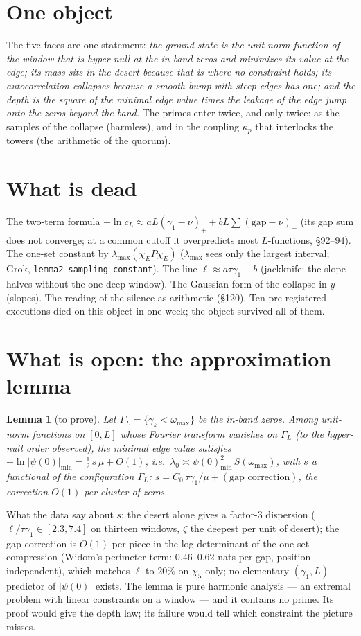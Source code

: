 \documentclass[11pt]{article}
\newtheorem{lemma}{Lemma}\newtheorem{conjecture}{Conjecture}
\begin{document}
\section{One object}
The five faces are one statement: \emph{the ground state is the unit-norm function of the window that is hyper-null at the in-band zeros and minimizes its value at the edge; its mass sits in the desert because that is where no constraint holds; its autocorrelation collapses because a smooth bump with steep edges has one; and the depth is the square of the minimal edge value times the leakage of the edge jump onto the zeros beyond the band.} The primes enter twice, and only twice: as the samples of the collapse (harmless), and in the coupling $\kappa_p$ that interlocks the towers (the arithmetic of the quorum).

\section{What is dead}
The two-term formula $-\ln c_L\approx aL(\gamma_1-\nu)_++bL\sum(\text{gap}-\nu)_+$ (its gap sum does not converge; at a common cutoff it overpredicts most $L$-functions, \S92--94). The one-set constant by $\lambda_{\max}(\chi_EP\chi_E)$ ($\lambda_{\max}$ sees only the largest interval; Grok, \texttt{lemma2-sampling-constant}). The line $\ell\approx a\tau\gamma_1+b$ (jackknife: the slope halves without the one deep window). The Gaussian form of the collapse in $y$ (slopes). The reading of the silence as arithmetic (\S120). Ten pre-registered executions died on this object in one week; the object survived all of them.

\section{What is open: the approximation lemma}
\begin{lemma}[to prove]
Let $\Gamma_L=\{\gamma_k<\omega_{\max}\}$ be the in-band zeros. Among unit-norm functions on $[0,L]$ whose Fourier transform vanishes on $\Gamma_L$ (to the hyper-null order observed), the minimal edge value satisfies $-\ln|\psi(0)|_{\min}=\tfrac12\,s\,\mu+O(1)$, i.e.\ $\lambda_0\asymp\psi(0)^2_{\min}\,S(\omega_{\max})$, with $s$ a functional of the configuration $\Gamma_L$: $s=C_0\,\tau\gamma_1/\mu+(\text{gap correction})$, the correction $O(1)$ per cluster of zeros.
\end{lemma}
What the data say about $s$: the desert alone gives a factor-$3$ dispersion ($\ell/\tau\gamma_1\in[2.3,7.4]$ on thirteen windows, $\zeta$ the deepest per unit of desert); the gap correction is $O(1)$ per piece in the log-determinant of the one-set compression (Widom's perimeter term: $0.46$--$0.62$ nats per gap, position-independent), which matches $\ell$ to $20\%$ on $\chi_5$ only; no elementary $(\gamma_1,L)$ predictor of $|\psi(0)|$ exists. The lemma is pure harmonic analysis --- an extremal problem with linear constraints on a window --- and it contains no prime. Its proof would give the depth law; its failure would tell which constraint the picture misses.
\end{document}
